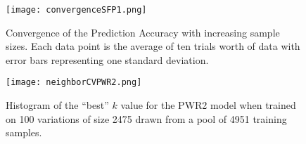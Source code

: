 \begin{figure}[!htbp]
	\centering
	\texttt{[image: convergenceSFP1.png]}
	\caption{Convergence of the Prediction Accuracy with increasing sample sizes. Each data point is the average of ten trials
	worth of data with error bars representing one standard deviation.}
	\label{fig:romConvergence}
\end{figure}

\begin{figure}[!htbp]
	\centering
	\texttt{[image: neighborCVPWR2.png]}
	\caption{Histogram of the ``best'' $k$ value for the PWR2 model when trained on 100 variations of size 2475 drawn from a pool of 4951 training samples. }
	\label{fig:neighborSelection}
\end{figure}